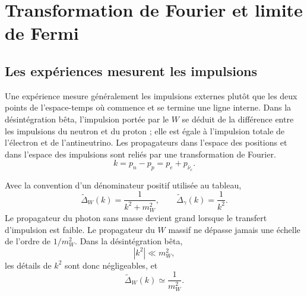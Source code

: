 \begin{classroomqa}
\end{classroomqa}

\section{Transformation de Fourier et limite de Fermi}

\subsection{Les expériences mesurent les impulsions}

Une expérience mesure généralement les impulsions externes plutôt que les deux points de l’espace-temps où commence et se termine une ligne interne. Dans la désintégration bêta, l’impulsion portée par le \(W\) se déduit de la différence entre les impulsions du neutron et du proton ; elle est égale à l’impulsion totale de l’électron et de l’antineutrino. Les propagateurs dans l’espace des positions et dans l’espace des impulsions sont reliés par une transformation de Fourier.
\begin{equation}
  k=p_n-p_p=p_e+p_{\bar\nu_e}.
\end{equation}

Avec la convention d’un dénominateur positif utilisée au tableau,
\begin{equation}
  \widetilde{\Delta}_W(k)=\frac1{k^2+m_W^2},
  \qquad
  \widetilde{\Delta}_\gamma(k)=\frac1{k^2}.
\end{equation}
Le propagateur du photon sans masse devient grand lorsque le transfert d’impulsion est faible. Le propagateur du \(W\) massif ne dépasse jamais une échelle de l’ordre de \(1/m_W^2\). Dans la désintégration bêta,
\begin{equation}
  |k^2|\ll m_W^2,
\end{equation}
les détails de \(k^2\) sont donc négligeables, et
\begin{equation}
  \widetilde{\Delta}_W(k)\simeq\frac1{m_W^2}.
\end{equation}

